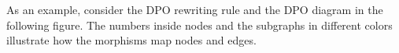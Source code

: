 As an example, consider the DPO rewriting rule 
and the DPO diagram in the following figure. The numbers inside nodes and the subgraphs in different colors illustrate how the morphisms map nodes and edges. 

